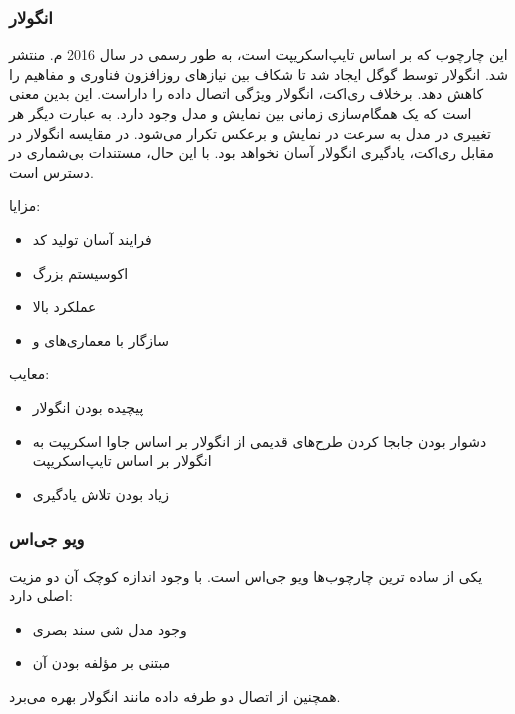 \subsubsection{انگولار}

این چارچوب که بر اساس تایپ‌اسکریپت است، به طور رسمی در سال 2016 م. منتشر شد. انگولار توسط گوگل ایجاد شد تا شکاف بین نیازهای روزافزون فناوری و مفاهیم  را کاهش دهد. برخلاف ری‌اکت، انگولار ویژگی اتصال داده را داراست. این بدین معنی است که یک همگام‌سازی زمانی بین نمایش و مدل وجود دارد. به عبارت دیگر هر تغییری در مدل به سرعت در نمایش و برعکس تکرار می‌شود. در مقایسه انگولار در مقابل ری‌اکت، یادگیری انگولار آسان نخواهد بود. با این حال، مستندات بی‌شماری در دسترس است\cite{noauthor_overview_nodate}.


مزایا:
\begin{itemize}
    \item فرایند آسان تولید کد
    \item اکوسیستم بزرگ
    \item عملکرد بالا
    \item سازگار با معماری‌های  و 
\end{itemize}


معایب:

\begin{itemize}
    \item پیچیده بودن انگولار
    \item دشوار بودن جابجا کردن طرح‌های قدیمی از انگولار بر اساس جاوا اسکریپت به انگولار بر اساس تایپ‌اسکریپت
    \item زیاد بودن تلاش یادگیری
\end{itemize}


\newpage

\subsubsection{ویو جی‌اس}

یکی از ساده ترین چارچوب‌ها ویو جی‌اس است. با وجود اندازه کوچک آن دو مزیت اصلی دارد:

\begin{itemize}
    \item وجود مدل شی سند بصری
    \item مبتنی بر مؤلفه بودن آن 
\end{itemize}
همچنین از اتصال دو طرفه داده مانند انگولار بهره می‌برد.


